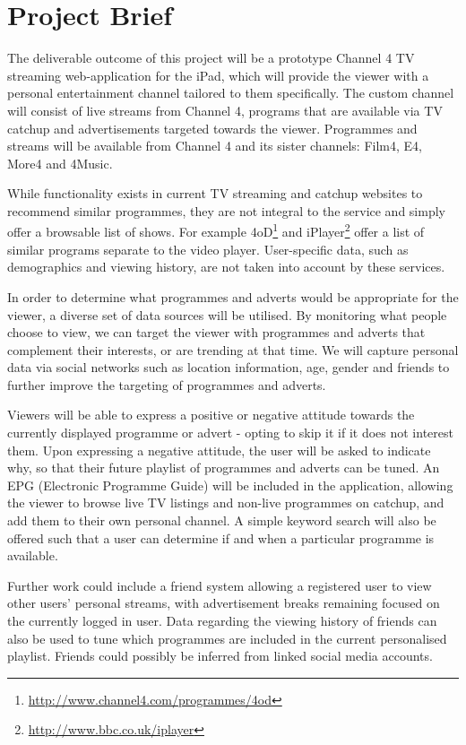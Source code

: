 \section{Project Brief}
\label{sec:appendix_brief}

The deliverable outcome of this project will be a prototype Channel 4 TV streaming web-application for the iPad, which will provide the viewer with a personal entertainment channel tailored to them specifically. The custom channel will consist of live streams from Channel 4, programs that are available via TV catchup and advertisements targeted towards the viewer. Programmes and streams will be available from Channel 4 and its sister channels: Film4, E4, More4 and 4Music.

While functionality exists in current TV streaming and catchup websites to recommend similar programmes, they are not integral to the service and simply offer a browsable list of shows. For example 4oD\footnote{\url{http://www.channel4.com/programmes/4od}} and iPlayer\footnote{\url{http://www.bbc.co.uk/iplayer}} offer a list of similar programs separate to the video player. User-specific data, such as demographics and viewing history, are not taken into account by these services.

In order to determine what programmes and adverts would be appropriate for the viewer, a diverse set of data sources will be utilised. By monitoring what people choose to view, we can target the viewer with programmes and adverts that complement their interests, or are trending at that time. We will capture personal data via social networks such as location information, age, gender and friends to further improve the targeting of programmes and adverts.

Viewers will be able to express a positive or negative attitude towards the currently displayed programme or advert - opting to skip it if it does not interest them. Upon expressing a negative attitude, the user will be asked to indicate why, so that their future playlist of programmes and adverts can be tuned. An EPG (Electronic Programme Guide) will be included in the application, allowing the viewer to browse live TV listings and non-live programmes on catchup, and add them to their own personal channel. A simple keyword search will also be offered such that a user can determine if and when a particular programme is available. 

Further work could include a friend system allowing a registered user to view other users' personal streams, with advertisement breaks remaining focused on the currently logged in user. Data regarding the viewing history of friends can also be used to tune which programmes are included in the current personalised playlist. Friends could possibly be inferred from linked social media accounts.

